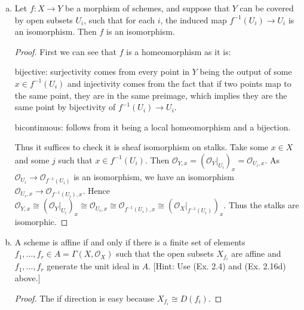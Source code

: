 \begin{exercise}%
\begin{enumerate}[(a)]
	\item Let $f:X\to Y $ be a morphism of schemes, and suppose that $Y $ can be covered by open subsets $U_i $, such that for each $i $, the induced map $f^{-1}(U_i)\to U_i $ is an isomorphism. Then $f $ is an isomorphism.
	\begin{proof}
		First we can see that $f $ is a homeomorphism as it is:

		bijective: surjectivity comes from every point in $Y $ being the output of some $x \in f^{-1}(U_i) $ and injectivity comes from the fact that if two points map to the same point, they are in the same preimage, which implies they are the same point by bijectivity of $f^{-1}(U_i) \to U_i $.

		bicontinuous: follows from it being a local homeomorphism and a bijection.

		Thus it suffices to check it is sheaf isomorphism on stalks.
		Take some $x \in X $ and some $j $ such that $x\in f^{-1}(U_i) $.
		Then $\mathscr{O}_{Y,x} = (\mathscr{O}_{Y}|_{U_i})_x = \mathscr{O}_{U_i,x}$.
		As $\mathscr{O}_{U_i} \to \mathscr{O}_{f^{-1}(U_i)}$ is an isomorphism, we have an isomorphism $\mathscr{O}_{U_i,x} \to \mathscr{O}_{f^{-1}(U_i),x}$.
		Hence $\mathscr{O}_{Y,x} \cong (\mathscr{O}_Y\big|_{U_i})_x \cong \mathscr{O}_{U_i,x}\cong \mathscr{O}_{f^{-1}(U_i),x}\cong (\mathscr{O}_X\big|_{f^{-1}(U_i)})_x$.
		Thus the stalks are isomorphic.
	\end{proof}
	\item A scheme is affine if and only if there is a finite set of elements $f_{1}, \ldots ,f_r \in A = \Gamma(X,\mathscr{O}_X) $ such that the open subsets $X_{f_i} $ are affine and $f_{1}, \ldots ,f_r $ generate the unit ideal in $A $.
		[Hint: Use (Ex. 2.4) and (Ex. 2.16d) above.]
	\begin{proof}
		The if direction is easy because $X_{f_i} \cong D(f_i) $.


\end{proof}
\end{enumerate}
\end{exercise}
